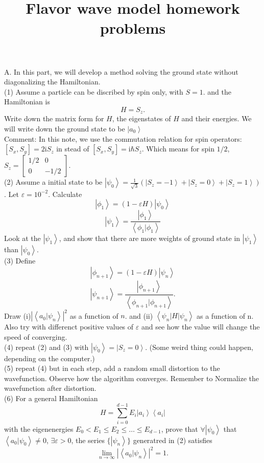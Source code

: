\documentclass[letter]{article}
\title{{\myfont Flavor wave model homework problems}}
\newcommand{\ii}{\mathrm{i}}
\begin{document}
\maketitle
{\large{A}}. In this part, we will develop a method solving the ground state without diagonalizing the Hamiltonian.\\
\indent (1)  Assume a particle can be discribed by spin only, with $S=1$. and the Hamiltonian is 
$$ H= S_z.
$$
Write down the matrix form for $H$, the eigenstates of $H$ and their energies. We will write down the ground state to be $\left|a_0\right>$\\
\indent Comment: In this note, we use the commutation relation for spin operators: $[S_x,S_y]=2\ii S_z$ in stead of $[S_x,S_y]=\ii \hbar S_z$. Which means for spin $1/2$, $S_z=\begin{bmatrix}
    1/2 & 0 \\
    0 &  -1/2
    \end{bmatrix}$.\\
\indent (2) Assume a initial state to be $\left|\psi_0\right>=\frac{1}{\sqrt{3}}(\left|S_z=-1\right>+\left|S_z=0\right>+\left|S_z=1\right>)$. Let $\varepsilon=10^{-2}$. Calculate 
$$\left|\phi_1\right>=\left(1-\varepsilon H \right)\left|\psi_0\right>$$
$$\left|\psi_1\right>=\frac{\left|\phi_1\right>}{\left<\phi_1|\phi_1\right>}$$
Look at the $\left|\psi_1\right>$, and show that  there are more weights of ground state in $\left|\psi_1\right>$ than $\left|\psi_0\right>$.\\
\indent (3) Define 
$$\left|\phi_{n+1}\right>=\left(1-\varepsilon H\right) \left|\psi_n\right>$$
$$\left|\psi_{n+1}\right>=\frac{\left|\phi_{n+1}\right>}{\left<\phi_{n+1}|\phi_{n+1}\right>}.$$
Draw (i)$\left|\left<a_0|\psi_n\right>\right|^2$ as a function of $n$. and 
(ii) $\left<\psi_n|H|\psi_n\right>$ as a function of n. Also try with differenct positive values of $\varepsilon$ and see how the value will change the speed of converging.\\
\indent (4) repeat (2) and (3) with $\left|\psi_0\right>=\left|S_z=0\right>$. (Some weird thing could happen, depending on the computer.)\\ 
\indent (5) repeat (4) but in each step, add a random small distortion to the wavefunction. Observe how the algorithm converges. Remember to Normalize the wavefunction after distortion.\\ 
\indent (6) For a general Hamiltonian
$$ H = \sum_{i=0}^{d-1} E_{i} \left|a_i\right>\left<a_i\right|
$$
with the eigenenergies $E_0<E_1\leq E_2 \leq \ldots\leq E_{d-1}$, prove that $\forall \left|\psi_0\right> $ that $\left<a_0|\psi_0\right>\neq 0$, $\exists \varepsilon>0$, the series $\{\left| \psi_n\right>\}$ generatred in (2) satisfies $$
\lim_{n\rightarrow\infty} \left|\left<a_0|\psi_n\right>\right|^2=1.
$$
\end{document}
